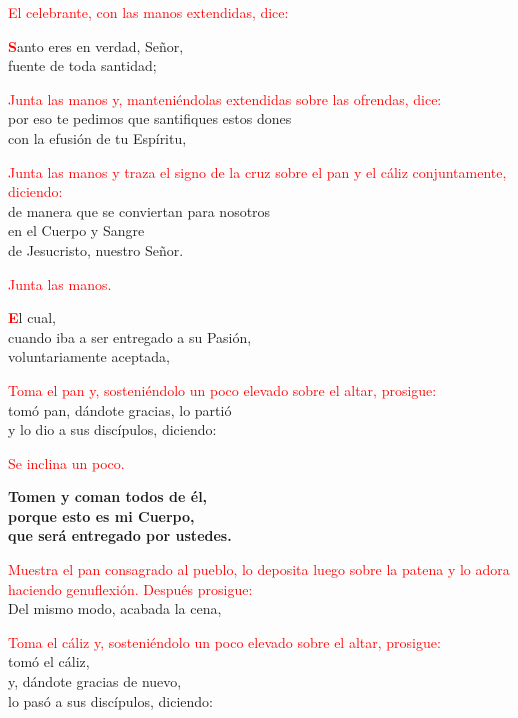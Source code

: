 \documentclass[12pt, letterpaper, spanish]{article}
\begin{document}
  \large{\textcolor{red}{El celebrante, con las manos extendidas, dice:}}

  \lettrine[lines=2]{\bfseries \textcolor{red}{S}}{}\Large anto eres en verdad, Se\~nor,\\
  fuente de toda santidad;

  \large{\textcolor{red}{Junta las manos y, manteni\'endolas extendidas sobre las ofrendas, dice:}}\\
  \Large por eso te pedimos que santifiques estos dones\\
  con la efusi\'on de tu Esp\'iritu,

  \large{\textcolor{red}{Junta las manos y traza el signo de la cruz sobre el pan y el c\'aliz conjuntamente, diciendo:}}\\
  \Large de manera que se conviertan para nosotros\\
  en el Cuerpo y \Huge{\textcolor{red}{}} \Large Sangre\\
  de Jesucristo, nuestro Se\~nor.

  \large{\textcolor{red}{Junta las manos.}}

  \lettrine[lines=2]{\bfseries \textcolor{red}{E}}{}\Large l cual,\\
  cuando iba a ser entregado a su Pasi\'on,\\
  voluntariamente aceptada,

  \large{\textcolor{red}{Toma el pan y, sosteni\'endolo un poco elevado sobre el altar, prosigue:}}\\
  \Large tom\'o pan, d\'andote gracias, lo parti\'o\\
  y lo dio a sus disc\'ipulos, diciendo:

  \large{\textcolor{red}{Se inclina un poco.}} 

  \noindent
  \LARGE{ \bfseries{ Tomen y coman todos de \'el,\\
  porque esto es mi Cuerpo,\\
  que ser\'a entregado por ustedes.}}

  \large{\textcolor{red}{Muestra el pan consagrado al pueblo, lo deposita luego sobre la patena y lo adora haciendo genuflexi\'on. Despu\'es prosigue:}}\\
  \Large Del mismo modo, acabada la cena,

  \large{\textcolor{red}{Toma el c\'aliz y, sosteni\'endolo un poco elevado sobre el altar, prosigue:}}\\
  \Large tom\'o el c\'aliz,\\
  y, d\'andote gracias de nuevo,\\
  lo pas\'o a sus disc\'ipulos, diciendo:
\end{document}
